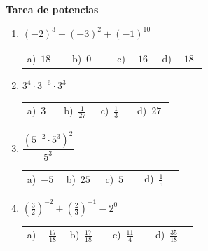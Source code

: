 \documentclass[11pt,a4paper]{article}
\begin{document}
{\Large\bfseries Tarea de potencias}
\vspace{12pt}
\begin{enumerate}[label=\textbf{\arabic*.},leftmargin=*,itemsep=11pt,topsep=0pt]
\item \begin{minipage}[t]{\linewidth}
$\displaystyle (-2)^{3}-(-3)^{2}+(-1)^{10}$

\vspace{5pt}
\begin{tabular}{@{}p{0.23\linewidth}p{0.23\linewidth}p{0.23\linewidth}p{0.23\linewidth}@{}}
a)~$\displaystyle 18$ & b)~$\displaystyle 0$ & c)~$\displaystyle -16$ & d)~$\displaystyle -18$ \\
\end{tabular}
\end{minipage}

\item \begin{minipage}[t]{\linewidth}
$\displaystyle 3^{4}\cdot 3^{-6}\cdot 3^{3}$

\vspace{5pt}
\begin{tabular}{@{}p{0.23\linewidth}p{0.23\linewidth}p{0.23\linewidth}p{0.23\linewidth}@{}}
a)~$\displaystyle 3$ & b)~$\displaystyle \frac{1}{27}$ & c)~$\displaystyle \frac{1}{3}$ & d)~$\displaystyle 27$ \\
\end{tabular}
\end{minipage}

\item \begin{minipage}[t]{\linewidth}
$\displaystyle \dfrac{\left(5^{-2}\cdot 5^{3}\right)^{2}}{5^{3}}$

\vspace{5pt}
\begin{tabular}{@{}p{0.23\linewidth}p{0.23\linewidth}p{0.23\linewidth}p{0.23\linewidth}@{}}
a)~$\displaystyle -5$ & b)~$\displaystyle 25$ & c)~$\displaystyle 5$ & d)~$\displaystyle \frac{1}{5}$ \\
\end{tabular}
\end{minipage}

\item \begin{minipage}[t]{\linewidth}
$\displaystyle \left(\frac{3}{2}\right)^{-2}+\left(\frac{2}{3}\right)^{-1}-2^{0}$

\vspace{5pt}
\begin{tabular}{@{}p{0.23\linewidth}p{0.23\linewidth}p{0.23\linewidth}p{0.23\linewidth}@{}}
a)~$\displaystyle -\frac{17}{18}$ & b)~$\displaystyle \frac{17}{18}$ & c)~$\displaystyle \frac{11}{4}$ & d)~$\displaystyle \frac{35}{18}$ \\
\end{tabular}
\end{minipage}


\end{enumerate}
\end{document}
